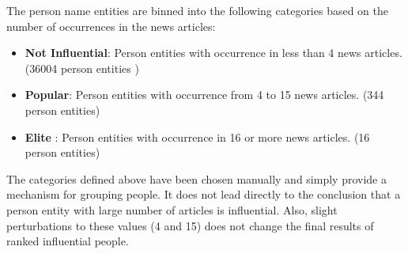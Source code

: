 The person name entities are binned into the following categories based on the number of occurrences in the news articles:
\begin{itemize}
 \item \textbf{Not Influential}: Person entities with occurrence in less than 4 news articles. (36004 person entities )
\item \textbf{Popular}: Person entities with occurrence from 4 to 15 news articles. (344 person entities) 
\item \textbf{Elite} : Person entities with occurrence in 16 or more news articles. (16 person entities)
\end{itemize}
The categories defined above have been chosen manually and simply provide a mechanism for grouping people. It does not lead directly to the conclusion that a person entity with large number of articles is influential. Also, slight perturbations to these values (4 and 15) does not change the final results of ranked influential people.

